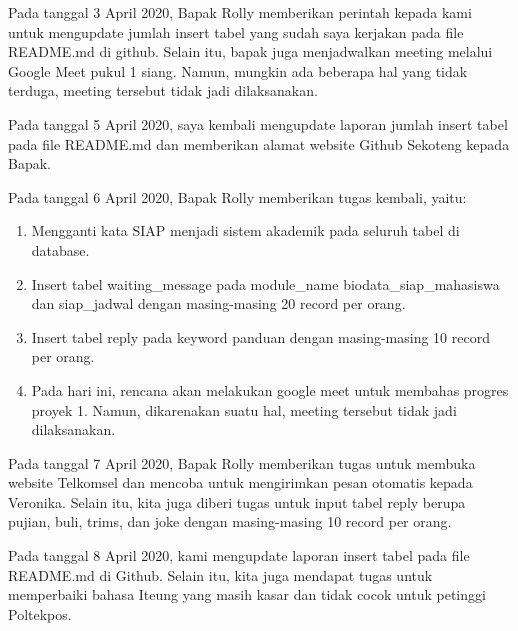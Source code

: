 \documentclass[a4paper, 12 pt]{article}
\newcounter{saveenumi}
\newcommand{\seti}{\setcounter{saveenumi}{\value{enumi}}} %
\begin{document}
            \par Pada tanggal 3 April 2020, Bapak Rolly memberikan perintah kepada kami untuk mengupdate jumlah insert tabel yang sudah saya kerjakan pada file README.md di github. Selain itu, bapak juga menjadwalkan meeting melalui Google Meet pukul 1 siang. Namun, mungkin ada beberapa hal yang tidak terduga, meeting tersebut tidak jadi dilaksanakan. \\
            
            \par Pada tanggal 5 April 2020, saya kembali mengupdate laporan jumlah insert tabel pada file README.md dan memberikan alamat website Github Sekoteng kepada Bapak. \\
            
            \par Pada tanggal 6 April 2020, Bapak Rolly memberikan tugas kembali, yaitu:
            \begin{enumerate}
                \item Mengganti kata SIAP menjadi sistem akademik pada seluruh tabel di database.
                \item Insert tabel waiting\_message pada module\_name biodata\_siap\_mahasiswa dan siap\_jadwal dengan masing-masing 20 record per orang.
                \item Insert tabel reply pada keyword panduan dengan masing-masing 10 record per orang.
                \item Pada hari ini, rencana akan melakukan google meet untuk membahas progres proyek 1. Namun, dikarenakan suatu hal, meeting tersebut tidak jadi dilaksanakan.
                \seti
            \end{enumerate}
            
            \par Pada tanggal 7 April 2020, Bapak Rolly memberikan tugas untuk membuka website Telkomsel dan mencoba untuk mengirimkan pesan otomatis kepada Veronika. Selain itu, kita juga diberi tugas untuk input tabel reply berupa pujian, buli, trims, dan joke dengan masing-masing 10 record per orang. \\
            
            \par Pada tanggal 8 April 2020, kami mengupdate laporan insert tabel pada file README.md di Github. Selain itu, kita juga mendapat tugas untuk memperbaiki bahasa Iteung yang masih kasar dan tidak cocok untuk petinggi Poltekpos. \\
            
\end{document}
